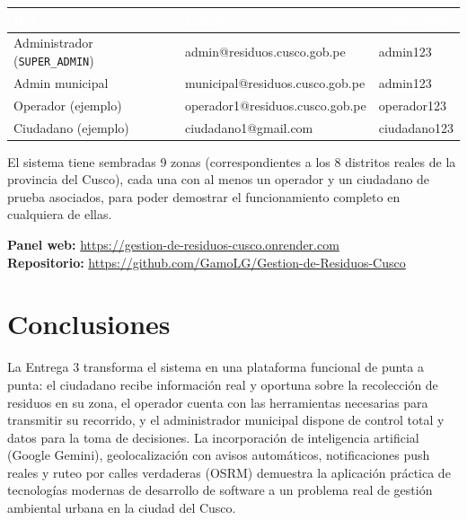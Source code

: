 \documentclass[11pt,a4paper]{article}
\begin{document}
\begin{center}
\begin{tabular}{|l|l|l|}
\hline
\rowcolor{azuloscuro}
\textcolor{white}{\textbf{Rol}} & \textcolor{white}{\textbf{Correo}} & \textcolor{white}{\textbf{Contraseña}} \\
\hline
Administrador (\texttt{SUPER\_ADMIN}) & admin@residuos.cusco.gob.pe & admin123 \\
\hline
Admin municipal & municipal@residuos.cusco.gob.pe & admin123 \\
\hline
Operador (ejemplo) & operador1@residuos.cusco.gob.pe & operador123 \\
\hline
Ciudadano (ejemplo) & ciudadano1@gmail.com & ciudadano123 \\
\hline
\end{tabular}
\end{center}

El sistema tiene sembradas 9 zonas (correspondientes a los 8 distritos reales de la provincia del Cusco), cada una con al menos un operador y un ciudadano de prueba asociados, para poder demostrar el funcionamiento completo en cualquiera de ellas.

\begin{mdframed}[backgroundcolor=azulinfo,linecolor=azuloscuro,linewidth=1pt]
\textbf{Panel web:} \url{https://gestion-de-residuos-cusco.onrender.com} \\
\textbf{Repositorio:} \url{https://github.com/GamoLG/Gestion-de-Residuos-Cusco}
\end{mdframed}

\section{Conclusiones}

La Entrega 3 transforma el sistema en una plataforma funcional de punta a punta: el ciudadano recibe información real y oportuna sobre la recolección de residuos en su zona, el operador cuenta con las herramientas necesarias para transmitir su recorrido, y el administrador municipal dispone de control total y datos para la toma de decisiones. La incorporación de inteligencia artificial (Google Gemini), geolocalización con avisos automáticos, notificaciones push reales y ruteo por calles verdaderas (OSRM) demuestra la aplicación práctica de tecnologías modernas de desarrollo de software a un problema real de gestión ambiental urbana en la ciudad del Cusco.
\end{document}
